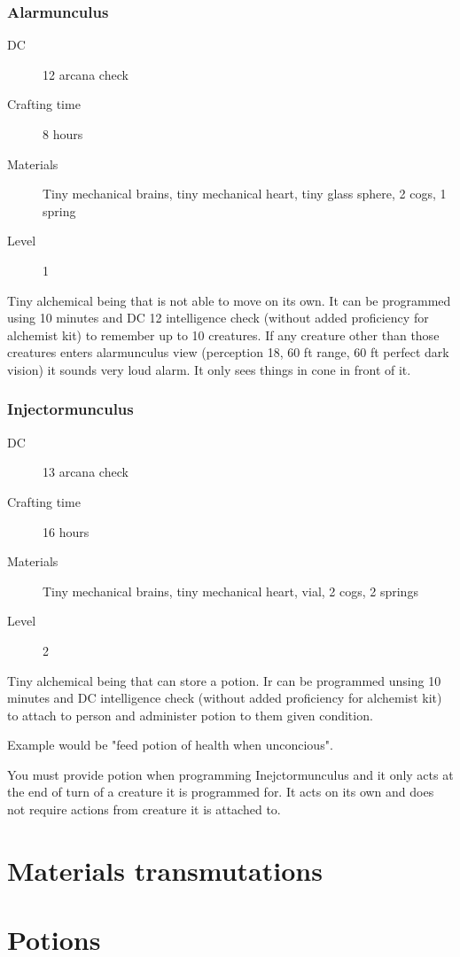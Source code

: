 \subsubsection{Alarmunculus}

\begin{description}
\item [DC] 12 arcana check
\item [Crafting time] 8 hours
\item [Materials] Tiny mechanical brains, tiny mechanical heart, tiny glass sphere, 2 cogs, 1 spring
\item [Level] 1
\end{description}

Tiny alchemical being that is not able to move on its own. It can be programmed using 10 minutes and DC 12 intelligence check (without added proficiency for alchemist kit) to remember up to 10 creatures. If any creature other than those creatures enters alarmunculus view (perception 18, 60 ft range, 60 ft perfect dark vision) it sounds very loud alarm. It only sees things in cone in front of it.

\subsubsection{Injectormunculus}

\begin{description}
\item [DC] 13 arcana check
\item [Crafting time] 16 hours
\item [Materials] Tiny mechanical brains, tiny mechanical heart, vial, 2 cogs, 2 springs
\item [Level] 2
\end{description}

Tiny alchemical being that can store a potion. Ir can be programmed unsing 10 minutes and DC intelligence check (without added proficiency for alchemist kit) to attach to person and administer potion to them given condition.

Example would be "feed potion of health when unconcious".

You must provide potion when programming Inejctormunculus and it only acts at the end of turn of a creature it is programmed for. It acts on its own and does not require actions from creature it is attached to.


\section{Materials transmutations}

\section{Potions}